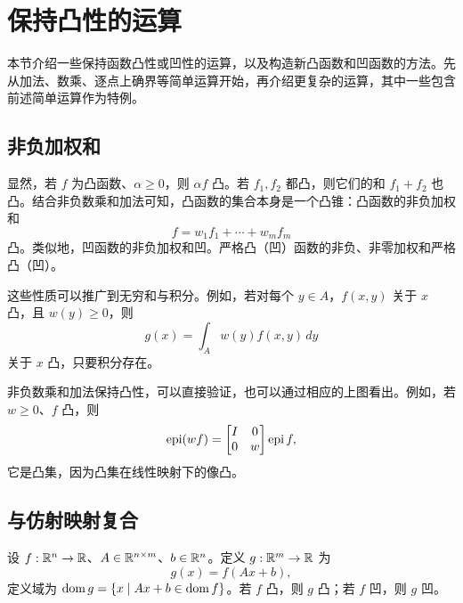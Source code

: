\section{保持凸性的运算}
本节介绍一些保持函数凸性或凹性的运算，以及构造新凸函数和凹函数的方法。先从加法、数乘、逐点上确界等简单运算开始，再介绍更复杂的运算，其中一些包含前述简单运算作为特例。
\subsection{非负加权和}
显然，若 $f$ 为凸函数、$\alpha\geq0$，则 $\alpha f$ 凸。若 $f_1,f_2$ 都凸，则它们的和 $f_1+f_2$ 也凸。结合非负数乘和加法可知，凸函数的集合本身是一个凸锥：凸函数的非负加权和
\[f=w_1f_1+\cdots+w_mf_m\]
凸。类似地，凹函数的非负加权和凹。严格凸（凹）函数的非负、非零加权和严格凸（凹）。

这些性质可以推广到无穷和与积分。例如，若对每个 $y\in A$，$f(x,y)$ 关于 $x$ 凸，且 $w(y)\geq0$，则
\[g(x)=\int_A w(y)f(x,y)\,dy\]
关于 $x$ 凸，只要积分存在。

非负数乘和加法保持凸性，可以直接验证，也可以通过相应的上图看出。例如，若 $w\geq0$、$f$ 凸，则
\[\operatorname{epi}(wf)=\begin{bmatrix}I&0\\0&w\end{bmatrix}\operatorname{epi} f,\]
它是凸集，因为凸集在线性映射下的像凸。
\subsection{与仿射映射复合}
设 $f:\mathbb R^n\to\mathbb R$、$A\in\mathbb R^{n\times m}$、$b\in\mathbb R^n$。定义 $g:\mathbb R^m\to\mathbb R$ 为
\[g(x)=f(Ax+b),\]
定义域为 $\operatorname{dom} g=\{x\mid Ax+b\in\operatorname{dom} f\}$。若 $f$ 凸，则 $g$ 凸；若 $f$ 凹，则 $g$ 凹。
